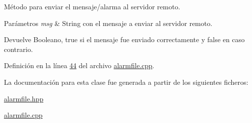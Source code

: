 Método para enviar el mensaje/alarma al servidor remoto. 


\begin{DoxyParams}{Parámetros}
{\em msg} & String con el mensaje a enviar al servidor remoto. \\
\hline
\end{DoxyParams}
\begin{DoxyReturn}{Devuelve}
Booleano, true si el mensaje fue enviado correctamente y false en caso contrario. 
\end{DoxyReturn}


Definición en la línea \hyperlink{alarmfile_8cpp_source_l00044}{44} del archivo \hyperlink{alarmfile_8cpp_source}{alarmfile.\+cpp}.



La documentación para esta clase fue generada a partir de los siguientes ficheros\+:\begin{DoxyCompactItemize}
\item 
\hyperlink{alarmfile_8hpp}{alarmfile.\+hpp}\item 
\hyperlink{alarmfile_8cpp}{alarmfile.\+cpp}\end{DoxyCompactItemize}

